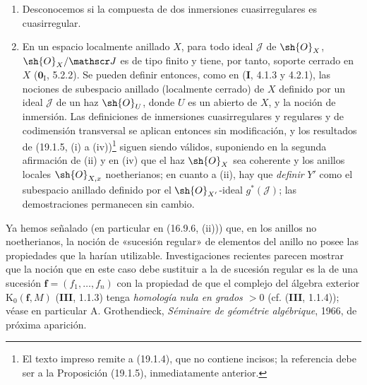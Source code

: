 \begin{remarks}[19.1.7]
\label{IV.19.1.7}
\begin{enumerate}
  \item[(i)] Desconocemos si la compuesta de dos inmersiones cuasirregulares es cuasirregular.
  \item[(ii)] En un espacio localmente anillado $X$, para todo ideal $\mathscr J$ de $\sh{O}_X$, $\sh{O}_X/\mathscr J$ es de tipo finito y tiene, por tanto, soporte cerrado en $X$ ($\mathbf{0}_{\mathrm I}$, 5.2.2). Se pueden definir entonces, como en (\textbf I, 4.1.3 y 4.2.1), las nociones de subespacio anillado (localmente cerrado) de $X$ definido por un ideal $\mathscr J$ de un haz $\sh{O}_U$, donde $U$ es un abierto de $X$, y la noción de inmersión. Las definiciones de inmersiones cuasirregulares y regulares y de codimensión transversal se aplican entonces sin modificación, y los resultados de (19.1.5, (i) a (iv))\footnote{El texto impreso remite a (19.1.4), que no contiene incisos; la referencia debe ser a la Proposición (19.1.5), inmediatamente anterior.} siguen siendo válidos, suponiendo en la segunda afirmación de (ii) y en (iv) que el haz $\sh{O}_X$ sea coherente y los anillos locales $\sh{O}_{X,x}$ noetherianos; en cuanto a (ii), hay que \emph{definir} $Y'$ como el subespacio anillado definido por el $\sh{O}_{X'}$-ideal $g^*(\mathscr J)$; las demostraciones permanecen sin cambio.
\end{enumerate}
\end{remarks}

\begin{env}[19.1.8]
\label{IV.19.1.8}
Ya hemos señalado (en particular en (16.9.6, (ii))) que, en los anillos no noetherianos, la noción de «sucesión regular» de elementos del anillo no posee las propiedades que la harían utilizable. Investigaciones recientes parecen mostrar que la noción que en este caso debe sustituir a la de sucesión regular es la de una sucesión $\mathbf f=(f_1,\ldots,f_n)$ con la propiedad de que el complejo del álgebra exterior $\mathrm K_0(\mathbf f,M)$ (\textbf{III}, 1.1.3) tenga \emph{homología nula en grados $>0$} (cf. (\textbf{III}, 1.1.4)); véase en particular A. Grothendieck, \emph{Séminaire de géométrie algébrique}, 1966, de próxima aparición.
\end{env}
